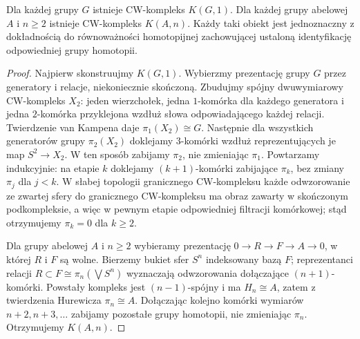 \begin{twierdzenie}
\label{thm:KGn-existence-v6}
Dla każdej grupy $G$ istnieje CW-kompleks $K(G,1)$.
Dla każdej grupy abelowej $A$ i $n\ge2$ istnieje
CW-kompleks $K(A,n)$. Każdy taki obiekt jest jednoznaczny
z dokładnością do równoważności homotopijnej zachowującej
ustaloną identyfikację odpowiedniej grupy homotopii.
\end{twierdzenie}
\begin{proof}
Najpierw skonstruujmy $K(G,1)$. Wybierzmy prezentację
grupy $G$ przez generatory i relacje, niekoniecznie skończoną.
Zbudujmy spójny dwuwymiarowy CW-kompleks $X_2$:
jeden wierzchołek, jedna $1$-komórka dla każdego generatora
i jedna $2$-komórka przyklejona wzdłuż słowa odpowiadającego
każdej relacji. Twierdzenie van Kampena daje $\pi_1(X_2)\cong G$.
Następnie dla wszystkich generatorów grupy $\pi_2(X_2)$
doklejamy $3$-komórki wzdłuż reprezentujących je map
$S^2\to X_2$. W ten sposób zabijamy $\pi_2$, nie zmieniając
$\pi_1$. Powtarzamy indukcyjnie: na etapie $k$ doklejamy
$(k+1)$-komórki zabijające $\pi_k$, bez zmiany $\pi_j$
dla $j<k$. W słabej topologii granicznego CW-kompleksu
każde odwzorowanie ze zwartej sfery do granicznego CW-kompleksu
ma obraz zawarty w skończonym podkompleksie, a więc
w pewnym etapie odpowiedniej filtracji komórkowej;
stąd otrzymujemy $\pi_k=0$ dla $k\ge2$.

Dla grupy abelowej $A$ i $n\ge2$ wybieramy prezentację
$0\to R\to F\to A\to0$, w której $R$ i $F$ są wolne.
Bierzemy bukiet sfer $S^n$ indeksowany bazą $F$;
reprezentanci relacji $R\subset F\cong\pi_n(\bigvee S^n)$
wyznaczają odwzorowania dołączające $(n+1)$-komórki.
Powstały kompleks jest $(n-1)$-spójny i ma
$H_n\cong A$, zatem z twierdzenia Hurewicza
$\pi_n\cong A$. Dołączając kolejno komórki wymiarów
$n+2,n+3,\ldots$ zabijamy pozostałe grupy homotopii,
nie zmieniając $\pi_n$. Otrzymujemy $K(A,n)$.


\end{proof}
